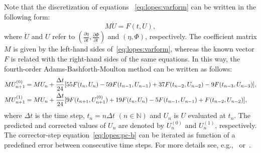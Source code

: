   Note that the discretization of equations
  ~\eqref{eq:lopes:varform} can be written in the following
  form:
\begin{equation}
M\dot U=F(t,U),
\end{equation}
where $\dot U$ and $U$ refer to $\displaystyle
\left(\frac{\partial \eta}{\partial t},\frac{\partial \Phi}{\partial t}\right)$ and
$(\eta,\Phi)$, respectively.  The coefficient matrix $M$ is
given by the left-hand sides of~\eqref{eq:lopes:varform},
whereas the known vector $F$ is related with the right-hand
sides of the same equations.  In this way, the fourth-order
Adams-Bashforth-Moulton method can be written as follows:
\begin{subequations}\label{eq:lopes:pc}
\begin{align}
&\displaystyle MU^{(0)}_{n+1}=MU_n+\frac{\Delta
    t}{24}[55{F}(t_n,U_n)-59{F}(t_{n-1},U_{n-1})+37{F}(t_{n-2},U_{n-2})-9{F}(t_{n-3},U_{n-3})],
\vspace{0.3cm} \label{eq:lopes:pc-a}\\ \displaystyle
&MU^{(1)}_{n+1}=MU_n+\frac{\Delta
  t}{24}[9{F}(t_{n+1},U^{(0)}_{n+1})+19{F}(t_n,U_n)-5{F}(t_{n-1},U_{n-1})+{F}(t_{n-2},U_{n-2})],\label{eq:lopes:pc-b}
\end{align}
\end{subequations}
where $\Delta t$ is the time step, $t_n=n\Delta t$ $(n\in
\mathbb{N})$ and $U_n$ is $U$ evaluated at $t_n$.  The
predicted and corrected values of $U_n$ are denoted by
$U_n^{(0)}$ and $U_n^{(1)}$, respectively.  The
corrector-step equation~\eqref{eq:lopes:pc-b} can be
iterated as function of a predefined error between
consecutive time steps.  For more details see,
e.g.,~\citet{HairerWanner1991a} or~\citet{Lambert1991}.

